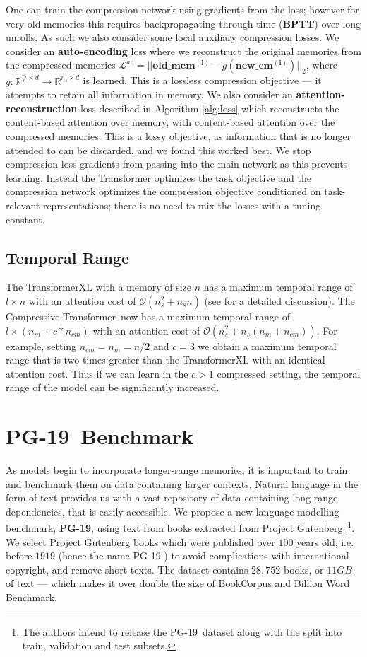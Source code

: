 One can train the compression network using gradients from the loss; however for very old memories this requires backpropagating-through-time (\textbf{BPTT}) over long unrolls. As such we also consider some local auxiliary compression losses. We consider an \textbf{auto-encoding} loss where we reconstruct the original memories from the compressed memories $\mathcal{L}^{ae} = ||\mathbf{old\_mem^{(i)}} - g(\mathbf{new\_cm^{(i)}})||_2$, where $g: \mathbb{R}^{\frac{n_s}{c} \times d} \rightarrow \mathbb{R}^{n_s \times d}$ is learned. This is a lossless compression objective --- it attempts to retain all information in memory. We also consider an \textbf{attention-reconstruction} loss described in Algorithm \ref{alg:loss} which reconstructs the content-based attention over memory, with content-based attention over the compressed memories. This is a lossy objective, as information that is no longer attended to can be discarded, and we found this worked best. We stop compression loss gradients from passing into the main network as this prevents learning. Instead the Transformer optimizes the task objective and the compression network optimizes the compression objective conditioned on task-relevant representations; there is no need to mix the losses with a tuning constant.

\subsection{Temporal Range} The TransformerXL with a memory of size $n$ has a maximum temporal range of $l \times n$ with an attention cost of $\mathcal{O}(n_s^2 + n_s n)$ (see \cite{dai2019transformer} for a detailed discussion). The Compressive Transformer~now has a maximum temporal range of $l \times (n_m + c * n_{cm})$ with an attention cost of $\mathcal{O}(n_s^2 + n_s (n_m + n_{cm}))$. For example, setting $n_{cm} = n_m = n/2$ and $c=3$ we obtain a maximum temporal range that is two times greater than the TransformerXL with an identical attention cost. Thus if we can learn in the $c > 1$ compressed setting, the temporal range of the model can be significantly increased.  
\section{PG-19~Benchmark}
As models begin to incorporate longer-range memories, it is important to train and benchmark them on data containing larger contexts. Natural language in the form of text provides us with a vast repository of data containing long-range dependencies, that is easily accessible.  We propose a new language modelling benchmark, \textbf{PG-19}, using text from books extracted from Project Gutenberg~\footnote{The authors intend to release the PG-19~dataset along with the split into train, validation and test subsets.}. We select Project Gutenberg books which were published over $100$ years old, i.e. before $1919$ (hence the name PG-19 ) to avoid complications with international copyright, and remove short texts. The dataset contains $28,752$ books, or $11GB$ of text --- which makes it over double the size of BookCorpus and Billion Word Benchmark. 


